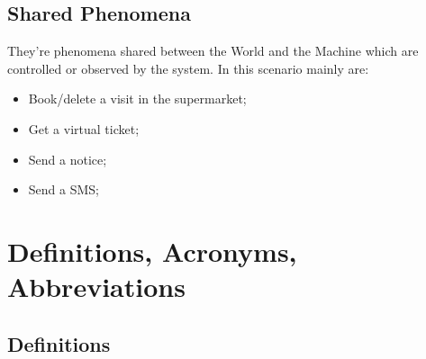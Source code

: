 \subsection{Shared Phenomena} 
They're phenomena shared between the World and the Machine which are controlled or observed by the system. In this scenario mainly are:

\begin{itemize}
\item Book/delete a visit in the supermarket;
\item Get a virtual ticket;
\item Send a notice;
\item Send a SMS;

\end{itemize}


\section{Definitions, Acronyms, Abbreviations}
\subsection{Definitions}

